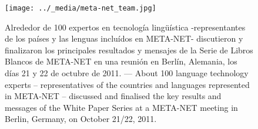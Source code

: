 \renewcommand*{\figureformat}{}
\renewcommand*{\captionformat}{}

\begin{figure}[htbp]
  \center
    \texttt{[image: ../\_media/meta-net\_team.jpg]}
  \caption{Alrededor de 100 expertos en tecnología lingüística -representantes de los países y las lenguas incluídos en META-NET- discutieron y finalizaron los principales resultados y mensajes de la Serie de Libros Blancos de META-NET en una reunión en Berlín, Alemania, los días 21 y 22 de octubre de 2011. --- \textcolor{grey1}{About 100 language technology experts -- representatives of the countries and languages represented in META-NET -- discussed and finalised the key results and messages of the White Paper Series at a META-NET meeting in Berlin, Germany, on October 21/22, 2011.}}
  \medskip
\end{figure}

\cleardoublepage

\label{whitepaperseries}


